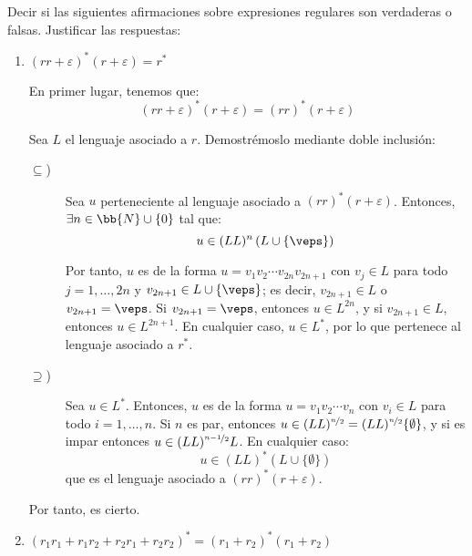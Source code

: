 \documentclass[12pt]{article}
\begin{document}
    \begin{ejercicio}[1.25 puntos]
        Decir si las siguientes afirmaciones sobre expresiones regulares son verdaderas o falsas. Justificar las respuestas:
        \begin{enumerate}
            \item $(rr + \varepsilon)^* (r + \varepsilon) = r^*$
            
            En primer lugar, tenemos que:
            \begin{equation*}
                (rr + \varepsilon)^* (r + \varepsilon)
                = (rr)^* (r + \varepsilon)
            \end{equation*}
            
            Sea $L$ el lenguaje asociado a $r$. Demostrémoslo mediante doble inclusión:
            \begin{description}
                \item[$\subseteq$)] Sea $u$ perteneciente al lenguaje asociado a $(rr)^* (r + \varepsilon)$. Entonces, $\exists n\in \bb{N}\cup \{0\}$ tal que:
                \begin{equation*}
                    u\in (LL)^n\left(L\cup \{\veps\}\right)
                \end{equation*}

                Por tanto, $u$ es de la forma $u=v_1v_2\cdots v_{2n}v_{2n+1}$ con $v_j\in L$ para todo $j=1,\ldots,2n$ y $v_{2n+1}\in L\cup \{\veps\}$; es decir, $v_{2n+1}\in L$ o $v_{2n+1}=\veps$. Si $v_{2n+1}=\veps$, entonces $u\in L^{2n}$, y si $v_{2n+1}\in L$, entonces $u\in L^{2n+1}$. En cualquier caso, $u\in L^*$, por lo que pertenece al lenguaje asociado a $r^*$.
                
                \item[$\supseteq$)] Sea $u\in L^*$. Entonces, $u$ es de la forma $u=v_1v_2\cdots v_n$ con $v_i\in L$ para todo $i=1,\ldots,n$. Si $n$ es par, entonces $u\in (LL)^{\nicefrac{n}{2}}=(LL)^{\nicefrac{n}{2}}\{\emptyset\}$, y si es impar entonces $u\in (LL)^{\nicefrac{n-1}{2}}L$. En cualquier caso:
                \begin{equation*}
                    u\in (LL)^*(L\cup \{\emptyset\})
                \end{equation*}
                que es el lenguaje asociado a $(rr)^* (r + \varepsilon)$.
            \end{description}

            Por tanto, es cierto.
            \item $(r_1 r_1 + r_1 r_2 + r_2 r_1 + r_2 r_2)^* = (r_1 + r_2)^* (r_1 + r_2)$
            

\end{enumerate}
\end{ejercicio}
\end{document}
